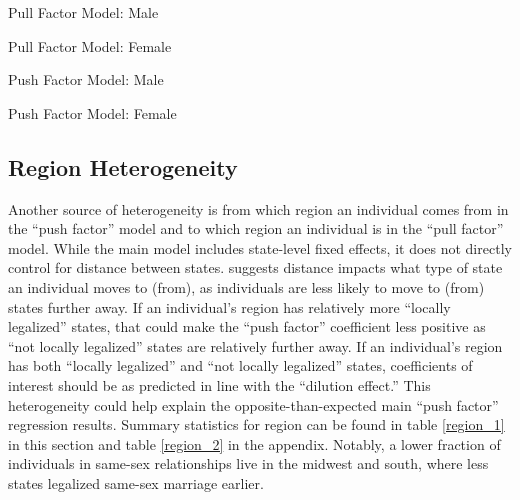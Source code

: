 \documentclass[12pt,letterpaper]{article}
\begin{document}
\clearpage %
\begin{table}[htbp] %
    \centering
    \caption{Pull Factor Model: Male}
    \label{tab: male_expost_model}
    
\end{table}
\begin{table}[htbp]
    \centering
    \caption{Pull Factor Model: Female}
    \label{tab: female_expost_model}
    
\end{table}
\begin{table}[htbp] %
    \centering
    \caption{Push Factor Model: Male}
    \label{tab: male_exante_model}
    
\end{table}
\begin{table}[htbp] %
    \centering
    \caption{Push Factor Model: Female}
    \label{tab: female_exante_model}
    
\end{table}

\clearpage
\subsection{Region Heterogeneity}

Another source of heterogeneity is from which region an individual comes from in the “push factor” model and to which region an individual is in the “pull factor” model. While the main model includes state-level fixed effects, it does not directly control for distance between states. \citep{1} suggests distance impacts what type of state an individual moves to (from), as individuals are less likely to move to (from) states further away. If an individual’s region has relatively more “locally legalized” states, that could make the  “push factor” coefficient less positive as “not locally legalized” states are relatively further away. If an individual’s region has both “locally legalized” and “not locally legalized” states, coefficients of interest should be as predicted in line with the “dilution effect.” This heterogeneity could help explain the opposite-than-expected main “push factor” regression results. Summary statistics for region can be found in table \ref{region_1} in this section and table \ref{region_2} in the appendix. Notably, a lower fraction of individuals in same-sex relationships live in the midwest and south, where less states legalized same-sex marriage earlier.
\end{document}

